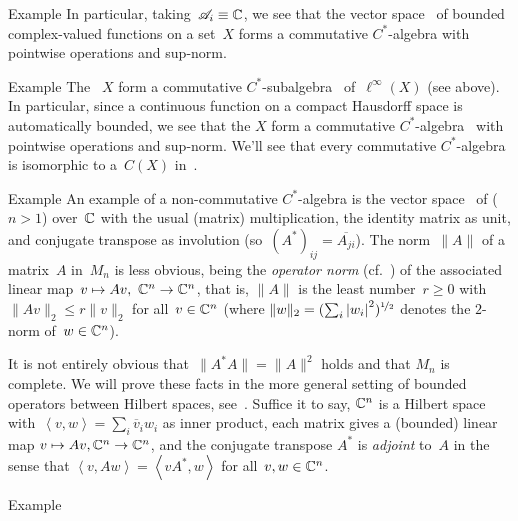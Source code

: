\documentclass[a]{subfiles}
\begin{document}
\begin{parsec}
\begin{point}{Example}
In particular,
taking~$\mathscr{A}_i\equiv \mathbb{C}$,
we see that
the vector space~ of bounded complex-valued functions
on a set~$X$ forms a commutative $C^*$-algebra
with pointwise operations and sup-norm.
\end{point}
\begin{point}{Example}%
The ~$X$
form a commutative $C^*$-subalgebra~
of~$\ell^\infty(X)$ (see above).
In particular,
since a continuous function on a compact Hausdorff space is 
automatically bounded,
we see that the  $X$
form a commutative $C^*$-algebra~
with pointwise operations and sup-norm.
We'll see that every commutative $C^*$-algebra
is isomorphic to a~$C(X)$
in~.
\end{point}
\begin{point}{Example}%
An example of a non-commutative
$C^*$-algebra
is
the vector space~
of  ($n>1$) over~$\mathbb{C}$
with the usual (matrix) multiplication,
the identity matrix as unit,
and conjugate transpose
as involution
(so~$(A^*)_{ij} = \overline{A_{ji}}$).
The norm~$\|A\|$ of a matrix~$A$ in~$M_n$
is less obvious,
being
the \emph{operator norm}
(cf.~)
of the associated linear map~$v\mapsto Av,\ \C^n\to\C^n$,
that is,
$\|A\|$ is
the least number~$r\geq 0$
with $\|Av\|_2\leq r\|v\|_2$
for all~$v\in \mathbb{C}^n$
(where $\|w\|_2=(\sum_i \left|w_i\right|^2)^{\nicefrac{1}{2}}$
denotes the $2$-norm
of~$w\in \mathbb{C}^n$).

It is not entirely obvious that~$\|A^*A\|=\|A\|^2$
holds
and that $M_n$ is complete.
We will prove these facts in the more general setting
of bounded operators between Hilbert spaces, 
see~.
Suffice it to say, $\mathbb{C}^n$ is a Hilbert space
with~$\left<v,w\right>=\sum_i \overline{v}_iw_i$
as inner product,
each matrix gives a (bounded) linear map $v\mapsto Av,\mathbb{C}^n\to \mathbb{C}^n$,
and the conjugate transpose $A^*$ is \emph{adjoint} to~$A$
in the sense that $\left<v,Aw\right> = \left<vA^*,w\right>$
for all~$v,w\in\mathbb{C}^n$.
\end{point}
\begin{point}{Example}%
\end{point}
\end{parsec}
\end{document}
